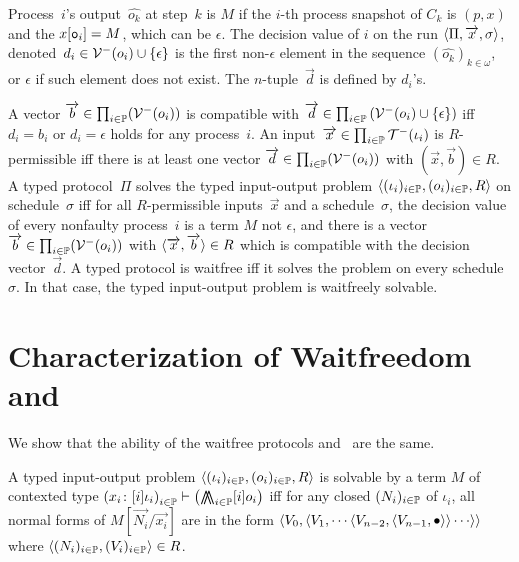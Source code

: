 {Process~$i$'s output~$\hat{o_k}$ at step~$k$ is
$M$ if the $i$-th process snapshot of $C_k$ is
$(p, x)$ and the $x[\texttt{o}_i] = M$, which can be $\epsilon$.
The decision value of $i$ on the run $\langle{\Pi,\overrightarrow x,\sigma}\rangle$,
denoted~$d_i \in \mathcal{V}^-(o_i)\cup\{\epsilon\}$
 is the first non-$\epsilon$ element in the sequence
 $\left(\hat{o_k}\right)_{k\in\omega}$,
 or
$\epsilon$ if such element does not exist.
The $n$-tuple~$\vec d$ is defined by $d_i$'s.

A vector $\overrightarrow b\in \prod_{i\in \mathbb{P}}(\mathcal{V}^-(o_i))$
is compatible with $\overrightarrow d \in \prod_{i\in
\mathbb{P}}\left(\mathcal{V}^-(o_i)\cup\{\epsilon\}\right)$ iff
$d_i = b_i$ or $d_i = \epsilon$ holds for any process~$i$.
An input~$\overrightarrow x\in \prod_{i\in \mathbb{P}}\mathcal{T}^-(\iota_i)$
is \linebreak[2] $R$-permissible iff there is at least one
vector $\overrightarrow d\in \prod_{i\in \mathbb{P}}(\mathcal{V}^-(o_i))$ with $(\vec x, \vec b)\in R$.
A typed protocol~$\Pi$ solves the typed input-output problem
  $\langle{(\iota_i)_{i\in \mathbb{P}}, (o_i)_{i\in \mathbb{P}}, R}\rangle$ on
schedule~$\sigma$ iff for all $R$-permissible inputs~$\vec x$ and a
schedule~$\sigma$,
 the decision value of every nonfaulty process~$i$ is a term
       $M$ not $\epsilon$, and
 there is a vector $\overrightarrow b\in \prod_{i\in \mathbb{P}}(\mathcal{V}^- (o_i))$
 with $\langle{\overrightarrow x, \overrightarrow b}\rangle \in R$ which is compatible with the
 decision vector~$\vec d$.
 A typed protocol is waitfree iff it solves
 the problem on every schedule~$\sigma$.
 In that case, the typed input-output problem is
 waitfreely solvable.

\section{Characterization of Waitfreedom and \lgd}
\label{comparison}

We show that the ability of the waitfree protocols and \lgd\, are the same.
\begin{definition}
 A typed input-output problem
 $\langle{(\iota_i)_{i\in \mathbb{P}}, (o_i)_{i\in \mathbb{P}}, R}\rangle$ is
 solvable by a term
 $M$ of contexted type
 $\left({x_i} \colon{[i]\iota_i}\right)_{i\in\mathbb{P}}
 \vdash\left(\operatorname*{\bigwedge\kern -8pt \bigwedge}_{i\in
 \mathbb{P}}[i]o_i\right)$
 iff
 for any closed $(N_i)_{i\in \mathbb{P}}$ of $\iota_i$,
 all normal forms of $M[\vec{N_i}/\vec{x_i}]$
 are in the form
 $\langle{{V_0}, \langle{{V_1},
 \cdots\langle{{V_{n-2}},\langle{{V_{n-1}},\bullet}\rangle}\rangle\cdots}\rangle}\rangle$
 where $\langle{(N_i)_{i\in \mathbb{P}}, (V_i)_{i\in \mathbb{P}}}\rangle\in R$.
\end{definition}

}

